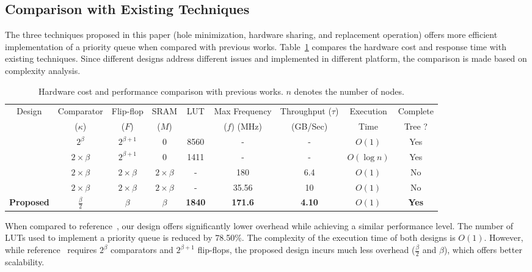 \subsection{Comparison with Existing Techniques}

The three techniques proposed in this paper (hole minimization, hardware sharing, and replacement operation) offers more efficient implementation of a priority queue when compared with previous works.
Table~\ref{table4} compares the hardware cost and response time with existing techniques.
Since different designs address different issues and implemented in different platform, the comparison is made based on complexity analysis.

\begin{table}
 \begin{center}
 \caption{Hardware cost and performance comparison with previous works. $n$ denotes the number of nodes.}
\label{table4}
\begin{tabular}{ |c|c|c|c|c|c|c|c|c| }
 \hline
 Design  & Comparator  & Flip-flop & SRAM & LUT &Max Frequency & Throughput ($\tau$) & Execution & Complete \\
  & ($\kappa$)& ($F$)& ($M$) &  & ($f$) (MHz) & (GB/Sec) & Time & Tree ?\\
 \hline
 \hline
 \cite{hw8} & $2^\beta$ & $2^{\beta +1}$& 0 & 8560 & - & - & $O(1)$ & Yes\\
 \hline
 \cite{hw11} & $2 \times \beta$ & $2^{\beta +1}$ & 0 & 1411 & - & - & $O(\log n)$ & Yes\\
 \hline
 \cite{fpga1} & $2 \times \beta$ & $2 \times \beta$ & $2 \times \beta$ & - & 180 &6.4 & $O(1)$ & No\\
 \hline
 \cite{hw2} & $2 \times \beta$ & $2 \times \beta$ & $2 \times \beta$ & - & 35.56 &10 & $O(1)$ & No\\
 \hline
{\bf Proposed} & {\bf $\frac{\beta}{2}$} & {\bf $\beta$} & {\bf $\beta$} & {\bf 1840} & {\bf 171.6} & {\bf 4.10} & {\bf $O(1)$} & {\bf Yes}\\
 \hline
\end{tabular}
\end{center}
\end{table}

When compared to reference~\cite{hw8}, our design offers significantly lower overhead while achieving a similar performance level.
The number of LUTs used to implement a priority queue is reduced by 78.50\%.
The complexity of the execution time of both designs is $O(1)$.
However, while reference~\cite{hw8} requires $2^\beta$ comparators and $2^{\beta+1}$ flip-flops, the proposed design incurs much less overhead ($\frac{\beta}{2}$ and $\beta$), which offers better scalability.

